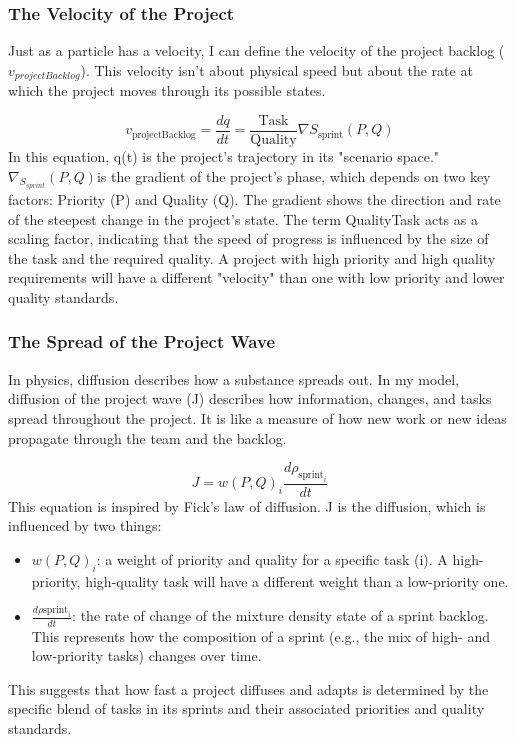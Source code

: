 \documentclass{article}
\begin{document}
\subsubsection*{The Velocity of the Project}
Just as a particle has a velocity, I can define the velocity of the project backlog ($v_{projectBacklog}$). This velocity isn't about physical speed but about the rate at which the project moves through its possible states.

\begin{equation}
v_{\text{projectBacklog}} = \frac{dq}{dt} = \frac{\text{Task}}{\text{Quality}} \nabla S_{\text{sprint}}(P, Q)
\end{equation}
In this equation, q(t) is the project's trajectory in its "scenario space." $\nabla_{S_{sprint}}(P,Q)$is the gradient of the project's phase, which depends on two key factors: Priority (P) and Quality (Q). The gradient shows the direction and rate of the steepest change in the project's state. The term QualityTask acts as a scaling factor, indicating that the speed of progress is influenced by the size of the task and the required quality. A project with high priority and high quality requirements will have a different "velocity" than one with low priority and lower quality standards.

\subsubsection*{The Spread of the Project Wave}
In physics, diffusion describes how a substance spreads out. In my model, diffusion of the project wave (J) describes how information, changes, and tasks spread throughout the project. It is like a measure of how new work or new ideas propagate through the team and the backlog.

\begin{equation}
J = w(P, Q)_i \frac{d \rho_{\text{sprint}_i}}{dt}
\end{equation}
This equation is inspired by Fick's law of diffusion. J is the diffusion, which is influenced by two things:
\begin{itemize}
\item $w(P,Q)_i$: a weight of priority and quality for a specific task (i). A high-priority, high-quality task will have a different weight than a low-priority one.
\item $\frac{d \rho{\text{sprint}_i}}{dt}$: the rate of change of the mixture density state of a sprint backlog. This represents how the composition of a sprint (e.g., the mix of high- and low-priority tasks) changes over time.
\end{itemize}
This suggests that how fast a project diffuses and adapts is determined by the specific blend of tasks in its sprints and their associated priorities and quality standards.
\end{document}
